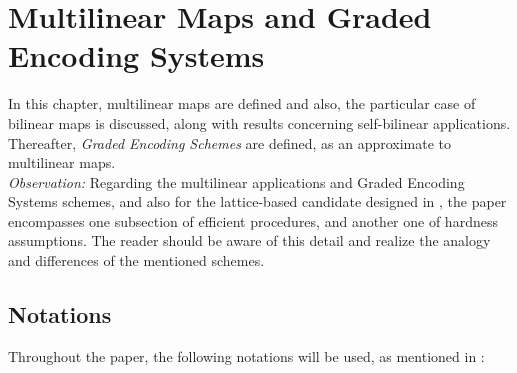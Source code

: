 \chapter{Multilinear Maps and Graded Encoding Systems}

In this chapter, multilinear maps are defined and also, the particular case of bilinear maps is discussed, along with results concerning self-bilinear applications. Thereafter, \textit{Graded Encoding Schemes} are defined, as an approximate to multilinear maps. \\

\textit{Observation:} Regarding the multilinear applications and Graded Encoding Systems schemes, and also for the lattice-based candidate designed in \cite{GGH13}, the paper encompasses one subsection of efficient procedures, and another one of hardness assumptions. The reader should be aware of this detail and realize the analogy and differences of the mentioned schemes.

\section{Notations}
Throughout the paper, the following notations will be used, as mentioned in \cite{BoS02}:

